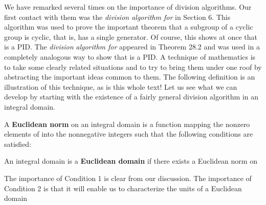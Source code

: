 \documentclass[11pt,oneside]{article}
\begin{document}
\fi
\renewcommand{\BookFooter}{Section 35 Euclidean Domains}
\ifdefined\BookMaster\else\setcounter{page}{286}\fi
\BookNarrativetrue

\begin{BookBody}


\noindent We have remarked several times on the importance of division algorithms. Our first contact with them was the\textit{ division algorithm for}  in Section 6. This algorithm was used to prove the important theorem that a subgroup of a cyclic group is cyclic, that is, has a single generator. Of course, this shows at once that  is a PID. The\textit{ division} \textit{algorithm for}  appeared in Theorem 28.2 and was used in a completely analogous way to show that  is a PID. A technique of mathematics is to take some clearly related situations and to try to bring them under one roof by abstracting the important ideas common to them. The following definition is an illustration of this technique, as is this whole text! Let us see what we can develop by starting with the existence of a fairly general division algorithm in an integral domain.

 A\textbf{ Euclidean norm} on an integral domain  is a function \BookInline{\nu } mapping the nonzero elements of  into the nonnegative integers such that the following conditions are satisfied:



\noindent An integral domain  is a\textbf{ Euclidean domain} if there exists a Euclidean norm on \BookEnd{\blacksquare}

The importance of Condition 1 is clear from our discussion. The importance of Condition 2 is that it will enable us to characterize the units of a Euclidean domain 


\end{BookBody}
\end{document}
